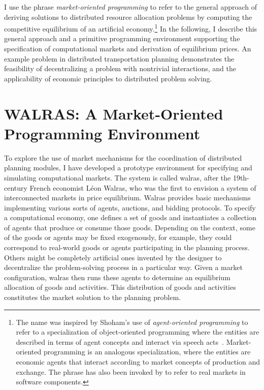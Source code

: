 I use the phrase {\em market-oriented programming\/} to refer to the 
general approach of deriving solutions to distributed resource 
allocation problems by computing the competitive equilibrium of an 
artificial economy.\footnote{The name was inspired by Shoham's use of
{\em agent-oriented programming\/} to refer to a specialization of 
object-oriented programming where the entities are described in terms of agent 
concepts and interact via speech acts~\cite{Shoham93}.
Market-oriented programming is an analogous specialization, where the entities
are economic agents that interact according to 
market concepts of production and exchange.  The phrase has also been 
invoked by  to refer to real markets in software 
components.}
In the following, I describe this general approach and a primitive
programming environment supporting the specification of computational 
markets and derivation of equilibrium prices.
An example problem in distributed transportation
planning demonstrates the feasibility of 
decentralizing a problem with nontrivial interactions, and the 
applicability of economic principles to distributed 
problem solving.

\section{WALRAS: A Market-Oriented Programming Environment}

To explore the use of market mechanisms for the coordination of 
distributed planning modules, I have developed a prototype 
environment for specifying and simulating computational markets.
The system is called {\sc walras}, after the 19th-century 
French economist L\'eon Walras, who was the first to envision a system of
interconnected markets in price equilibrium.
{\sc Walras} provides
basic mechanisms implementing various sorts of agents,
auctions, and bidding protocols. To specify a computational economy, one
defines a set of goods and instantiates a collection of agents that
produce or consume those goods.  
Depending on the context, some of the goods or agents may be fixed 
exogenously, for example, they could correspond to real-world goods or 
agents participating in the planning process.  Others might be completely 
artificial ones invented by the designer to decentralize the problem-solving 
process in a particular way.
Given a market configuration, {\sc walras} 
then runs these agents to determine an
equilibrium allocation of goods and activities.  This distribution of 
goods and activities constitutes the market solution to the planning problem.

